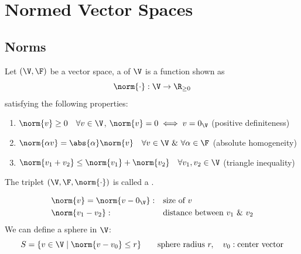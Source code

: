 \section{Normed Vector Spaces}\label{sec:normed}

\subsection{Norms}\label{ss:norms}

\begin{definition}
Let $(\V,\F)$ be a vector space, a  of $\V$ is a function shown as
\[ \norm{\cdot}: \V\to\R_{\ge0} \]
satisfying the following properties:
\begin{enumerate}[label=(N\arabic*),leftmargin=3.2em]
\item $\norm{v}\ge0 \quad \forall v\in\V$, \quad $\norm{v}=0 \iff v=0_{\V}$ \hfill (positive definiteness)
\item $\norm{\alpha v} = \abs{\alpha}\norm{v} \quad \forall v\in\V\ \&\ \forall\alpha\in\F$ \hfill (absolute homogeneity)
\item $\norm{v_1+v_2}\le\norm{v_1}+\norm{v_2} \quad \forall v_1,v_2\in\V$ \hfill (triangle inequality)
\end{enumerate}
The triplet $(\V,\F,\norm{\cdot})$ is called a .
\end{definition}
\begin{align*}
&\norm{v} = \norm{v-0_{\V}}: && \text{size of } v\\
&\norm{v_1-v_2}: && \text{distance between } v_1 \ \&\ v_2
\end{align*}
We can define a sphere in $\V$:
\[
S = \{ v\in\V \mid \norm{v-v_0}\le r\} \qquad \text{sphere radius } r,\quad v_0: \text{center vector}
\]

